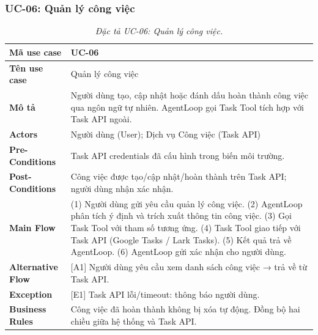 \subsubsection{UC-06: Quản lý công việc}
\label{subsec:spec-uc06}
\renewcommand{\arraystretch}{1.4}
\begin{longtable}{|>{\bfseries}p{3.5cm}|p{10.5cm}|}
  \caption{\emph{Đặc tả UC-06: Quản lý công việc.}} \label{tab:spec-uc06} \\
  \hline
  Mã use case      & UC-06 \\ \hline
  Tên use case     & Quản lý công việc \\ \hline
  Mô tả            & Người dùng tạo, cập nhật hoặc đánh dấu hoàn thành công việc qua ngôn ngữ tự nhiên. AgentLoop gọi Task Tool tích hợp với Task API ngoài. \\ \hline
  Actors           & Người dùng (User); Dịch vụ Công việc (Task API) \\ \hline
  Pre-Conditions   & Task API credentials đã cấu hình trong biến môi trường. \\ \hline
  Post-Conditions  & Công việc được tạo/cập nhật/hoàn thành trên Task API; người dùng nhận xác nhận. \\ \hline
  Main Flow        & (1) Người dùng gửi yêu cầu quản lý công việc.\newline
                     (2) AgentLoop phân tích ý định và trích xuất thông tin công việc.\newline
                     (3) Gọi Task Tool với tham số tương ứng.\newline
                     (4) Task Tool giao tiếp với Task API (Google Tasks / Lark Tasks).\newline
                     (5) Kết quả trả về AgentLoop.\newline
                     (6) AgentLoop gửi xác nhận cho người dùng. \\ \hline
  Alternative Flow & [A1] Người dùng yêu cầu xem danh sách công việc → trả về từ Task API. \\ \hline
  Exception        & [E1] Task API lỗi/timeout: thông báo người dùng. \\ \hline
  Business Rules   & Công việc đã hoàn thành không bị xóa tự động.\newline
                     Đồng bộ hai chiều giữa hệ thống và Task API. \\ \hline
\end{longtable}

